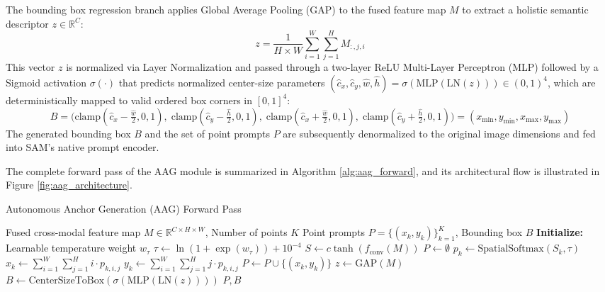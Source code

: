 \documentclass[onecolumn]{IEEEtran}
\numberwithin{equation}{section}
\theoremstyle{definition}
\theoremstyle{remark}
\begin{document}
The bounding box regression branch applies Global Average Pooling (GAP) to the fused feature map $M$ to extract a holistic semantic descriptor $z \in \mathbb{R}^C$:
\begin{equation}
    z = \frac{1}{H \times W} \sum_{i=1}^{W} \sum_{j=1}^{H} M_{:, j, i}
\end{equation}
This vector $z$ is normalized via Layer Normalization \cite{ba2016layer} and passed through a two-layer ReLU Multi-Layer Perceptron (MLP) followed by a Sigmoid activation $\sigma(\cdot)$ that predicts normalized center-size parameters $(\hat{c}_x, \hat{c}_y, \hat{w}, \hat{h}) = \sigma(\text{MLP}(\text{LN}(z))) \in (0, 1)^4$, which are deterministically mapped to valid ordered box corners in $[0, 1]^4$:
\begin{equation}
    B = \big(\text{clamp}(\hat{c}_x - \tfrac{\hat{w}}{2}, 0, 1),\; \text{clamp}(\hat{c}_y - \tfrac{\hat{h}}{2}, 0, 1),\; \text{clamp}(\hat{c}_x + \tfrac{\hat{w}}{2}, 0, 1),\; \text{clamp}(\hat{c}_y + \tfrac{\hat{h}}{2}, 0, 1)\big) = (x_{\min}, y_{\min}, x_{\max}, y_{\max})
\end{equation}
The generated bounding box $B$ and the set of point prompts $P$ are subsequently denormalized to the original image dimensions and fed into SAM's native prompt encoder. 

The complete forward pass of the AAG module is summarized in Algorithm \ref{alg:aag_forward}, and its architectural flow is illustrated in Figure \ref{fig:aag_architecture}.

\begin{algorithm}[htbp]
\caption{Autonomous Anchor Generation (AAG) Forward Pass}
\label{alg:aag_forward}
\begin{algorithmic}[1]
\Require Fused cross-modal feature map $M \in \mathbb{R}^{C \times H \times W}$, Number of points $K$
\Ensure Point prompts $P = \{(x_k, y_k)\}_{k=1}^K$, Bounding box $B$
\State \textbf{Initialize:} Learnable temperature weight $w_\tau$
\State $\tau \gets \ln(1 + \exp(w_\tau)) + 10^{-4}$ 
\State $S \gets c \tanh(f_{\text{conv}}(M))$ 
\State $P \gets \emptyset$
    \State $p_k \gets \text{SpatialSoftmax}(S_k, \tau)$ 
    \State $x_k \gets \sum_{i=1}^{W} \sum_{j=1}^{H} i \cdot p_{k, i, j}$ 
    \State $y_k \gets \sum_{i=1}^{W} \sum_{j=1}^{H} j \cdot p_{k, i, j}$ 
    \State $P \gets P \cup \{(x_k, y_k)\}$
\EndFor
\State $z \gets \text{GAP}(M)$ 
\State $B \gets \text{CenterSizeToBox}(\sigma(\text{MLP}(\text{LN}(z))))$ 
\State \Return $P, B$
\end{algorithmic}
\end{algorithm}
\end{document}
